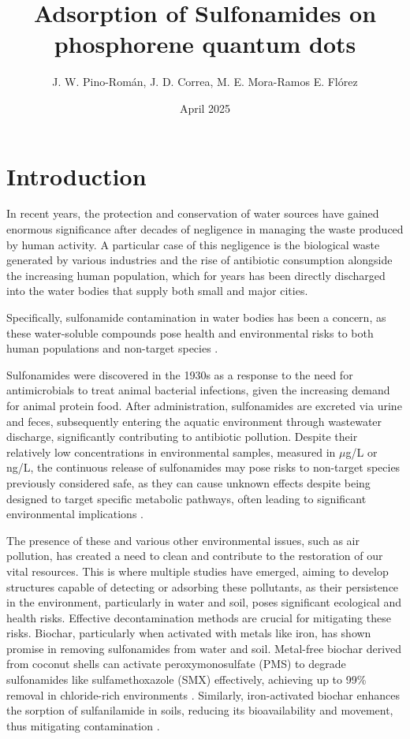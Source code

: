 \documentclass[preprint,12pt]{elsarticle}
\title{Adsorption of  Sulfonamides  on  phosphorene  quantum dots}
\author{J. W. Pino-Román,  J. D.  Correa,   M.  E.  Mora-Ramos E.  Flórez}
\date{April 2025}
\begin{document}
	
	\maketitle
	
	\section{Introduction}
	
	In recent years, the protection and conservation of water sources have gained enormous significance after decades of negligence in managing the waste produced by human activity. A particular case of this negligence is the biological waste generated by various industries and the rise of antibiotic consumption alongside the increasing human population, which for years has been directly discharged into the water bodies that supply both small and major cities.
	
	Specifically, sulfonamide contamination in water bodies has been a concern, as these water-soluble compounds pose health and environmental risks to both human populations and non-target species \cite{MacLoughlin2024}.
	
	Sulfonamides were discovered in the 1930s as a response to the need for antimicrobials to treat animal bacterial infections, given the increasing demand for animal protein food. After administration, sulfonamides are excreted via urine and feces, subsequently entering the aquatic environment through wastewater discharge, significantly contributing to antibiotic pollution. Despite their relatively low concentrations in environmental samples, measured in $\mu$g/L or ng/L, the continuous release of sulfonamides may pose risks to non-target species previously considered safe, as they can cause unknown effects despite being designed to target specific metabolic pathways, often leading to significant environmental implications \cite{Duan2022}.
	
	The presence of these and various other environmental issues, such as air pollution, has created a need to clean and contribute to the restoration of our vital resources. This is where multiple studies have emerged, aiming to develop structures capable of detecting or adsorbing these pollutants, as their persistence in the environment, particularly in water and soil, poses significant ecological and health risks. Effective decontamination methods are crucial for mitigating these risks. Biochar, particularly when activated with metals like iron, has shown promise in removing sulfonamides from water and soil. Metal-free biochar derived from coconut shells can activate peroxymonosulfate (PMS) to degrade sulfonamides like sulfamethoxazole (SMX) effectively, achieving up to 99\% removal in chloride-rich environments \cite{Hung2021Peroxymonosulfate}. Similarly, iron-activated biochar enhances the sorption of sulfanilamide in soils, reducing its bioavailability and movement, thus mitigating contamination \cite{Gamiz2022The}.
	
\end{document}
